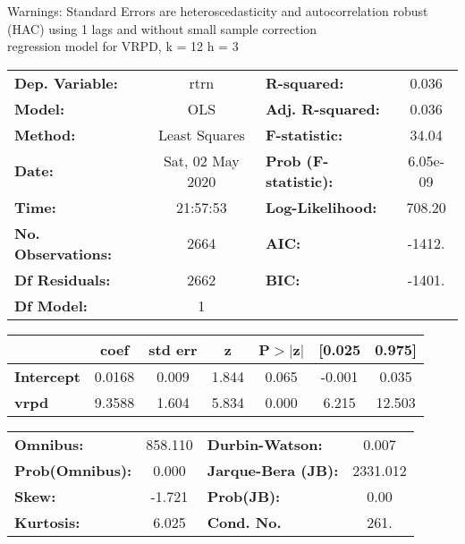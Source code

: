 Warnings: \newline
 [1] Standard Errors are heteroscedasticity and autocorrelation robust (HAC) using 1 lags and without small sample correction\\ 

regression model for VRPD, k = 12 h = 3\begin{center}
\begin{tabular}{lclc}
\toprule
\textbf{Dep. Variable:}    &       rtrn       & \textbf{  R-squared:         } &     0.036   \\
\textbf{Model:}            &       OLS        & \textbf{  Adj. R-squared:    } &     0.036   \\
\textbf{Method:}           &  Least Squares   & \textbf{  F-statistic:       } &     34.04   \\
\textbf{Date:}             & Sat, 02 May 2020 & \textbf{  Prob (F-statistic):} &  6.05e-09   \\
\textbf{Time:}             &     21:57:53     & \textbf{  Log-Likelihood:    } &    708.20   \\
\textbf{No. Observations:} &        2664      & \textbf{  AIC:               } &    -1412.   \\
\textbf{Df Residuals:}     &        2662      & \textbf{  BIC:               } &    -1401.   \\
\textbf{Df Model:}         &           1      & \textbf{                     } &             \\
\bottomrule
\end{tabular}
\begin{tabular}{lcccccc}
                   & \textbf{coef} & \textbf{std err} & \textbf{z} & \textbf{P$> |$z$|$} & \textbf{[0.025} & \textbf{0.975]}  \\
\midrule
\textbf{Intercept} &       0.0168  &        0.009     &     1.844  &         0.065        &       -0.001    &        0.035     \\
\textbf{vrpd}      &       9.3588  &        1.604     &     5.834  &         0.000        &        6.215    &       12.503     \\
\bottomrule
\end{tabular}
\begin{tabular}{lclc}
\textbf{Omnibus:}       & 858.110 & \textbf{  Durbin-Watson:     } &    0.007  \\
\textbf{Prob(Omnibus):} &   0.000 & \textbf{  Jarque-Bera (JB):  } & 2331.012  \\
\textbf{Skew:}          &  -1.721 & \textbf{  Prob(JB):          } &     0.00  \\
\textbf{Kurtosis:}      &   6.025 & \textbf{  Cond. No.          } &     261.  \\
\bottomrule
\end{tabular}
\end{center}

